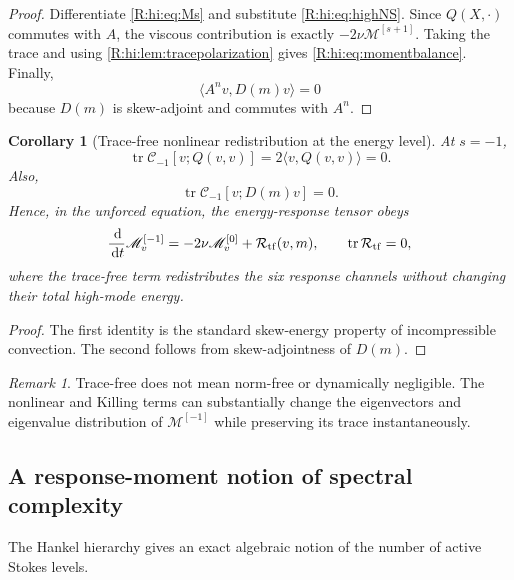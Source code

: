 \documentclass[
 aps,
 prd,
 reprint,
 amsmath,
 amssymb,
 nofootinbib,
 superscriptaddress
]{revtex4-2}
\newtheorem{corollary}[theorem]{Corollary}
\theoremstyle{definition}
\theoremstyle{remark}
\newtheorem{remark}[theorem]{Remark}
\newcommand{\cM}{\mathscr M}
\newcommand{\cC}{\mathscr C}
\newcommand{\dd}{\,\mathrm d}
\newcommand{\tr}{\operatorname{tr}}
\begin{document}
\begin{proof}
Differentiate \eqref{R:hi:eq:Ms} and substitute \eqref{R:hi:eq:highNS}.  Since
$Q(X,\cdot)$ commutes with $A$, the viscous contribution is exactly
$-2\nu\cM^{[s+1]}$.  Taking the trace and using
\cref{R:hi:lem:tracepolarization} gives \eqref{R:hi:eq:momentbalance}.  Finally,
\[
 \langle A^n v,D(m)v\rangle=0
\]
because $D(m)$ is skew-adjoint and commutes with $A^n$.
\end{proof}

\begin{corollary}[Trace-free nonlinear redistribution at the energy level]
\label{R:hi:cor:tracefree}
At $s=-1$,
\begin{equation}
 \tr\cC_{-1}[v;Q(v,v)]
 =
 2\langle v,Q(v,v)\rangle
 =
 0.
 \label{R:hi:eq:tracefreeQ}
\end{equation}
Also,
\begin{equation}
 \tr\cC_{-1}[v;D(m)v]=0.
 \label{R:hi:eq:tracefreeD}
\end{equation}
Hence, in the unforced equation, the energy-response tensor obeys
\begin{equation}
 \frac{\dd}{\dd t}\cM_v^{[-1]}
 =
 -2\nu\cM_v^{[0]}
 +
 \mathcal R_{\rm tf}(v,m),
 \qquad
 \tr\mathcal R_{\rm tf}=0,
 \label{R:hi:eq:energymatrixbalance}
\end{equation}
where the trace-free term redistributes the six response channels without
changing their total high-mode energy.
\end{corollary}

\begin{proof}
The first identity is the standard skew-energy property of incompressible
convection.  The second follows from skew-adjointness of $D(m)$.
\end{proof}

\begin{remark}
Trace-free does not mean norm-free or dynamically negligible.  The nonlinear
and Killing terms can substantially change the eigenvectors and eigenvalue
distribution of $\cM^{[-1]}$ while preserving its trace instantaneously.
\end{remark}

\subsection{A response-moment notion of spectral complexity}

The Hankel hierarchy gives an exact algebraic notion of the number of active
Stokes levels.
\end{document}
